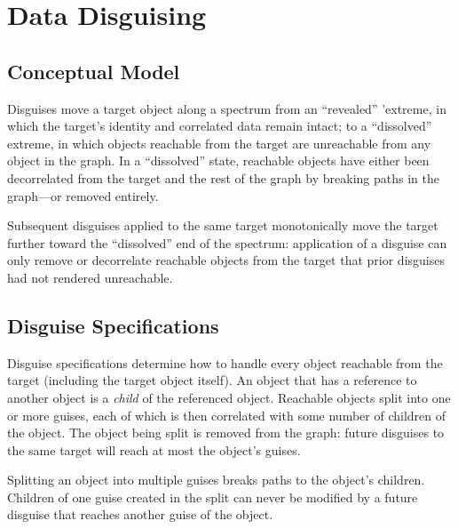 \section{Data Disguising}
\subsection{Conceptual Model}

Disguises move a target object along a spectrum from an ``revealed'' 'extreme, in which the target's
identity and correlated data remain intact; to a ``dissolved'' extreme, in which objects reachable
from the target are unreachable from any object in the graph. In a ``dissolved'' state, reachable
objects have either been decorrelated from the target and the rest of the graph by breaking paths in
the graph---or removed entirely.

Subsequent disguises applied to the same target monotonically move the target further
toward the ``dissolved'' end of the spectrum: application of a disguise can only 
remove or decorrelate reachable objects from the target that prior disguises had not
rendered unreachable.

\subsection{Disguise Specifications}

Disguise specifications determine how to handle every object reachable from the target (including
the target object itself). An object that has a reference to another object is a \emph{child} of the
referenced object. Reachable objects split into one or more guises, each of which is then correlated
with some number of children of the object.  The object being split is removed from the graph:
future disguises to the same target will reach at most the object's guises.

Splitting an object into multiple guises breaks paths to the object's children. 
Children of one guise created in the split can never be modified by a future disguise that
reaches another guise of the object. 


